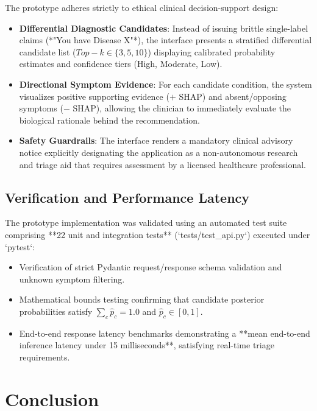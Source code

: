 The prototype adheres strictly to ethical clinical decision-support design:
\begin{itemize}
    \item \textbf{Differential Diagnostic Candidates}: Instead of issuing brittle single-label claims (*"You have Disease X"*), the interface presents a stratified differential candidate list ($Top-k \in \{3, 5, 10\}$) displaying calibrated probability estimates and confidence tiers (High, Moderate, Low).
    \item \textbf{Directional Symptom Evidence}: For each candidate condition, the system visualizes positive supporting evidence ($+$ SHAP) and absent/opposing symptoms ($-$ SHAP), allowing the clinician to immediately evaluate the biological rationale behind the recommendation.
    \item \textbf{Safety Guardrails}: The interface renders a mandatory clinical advisory notice explicitly designating the application as a non-autonomous research and triage aid that requires assessment by a licensed healthcare professional.
\end{itemize}

\subsection{Verification and Performance Latency}
\label{subsec:prototype_verification}

The prototype implementation was validated using an automated test suite comprising **22 unit and integration tests** (`tests/test_api.py`) executed under `pytest`:
\begin{itemize}
    \item Verification of strict Pydantic request/response schema validation and unknown symptom filtering.
    \item Mathematical bounds testing confirming that candidate posterior probabilities satisfy $\sum_{c} \hat{p}_c = 1.0$ and $\hat{p}_c \in [0, 1]$.
    \item End-to-end response latency benchmarks demonstrating a **mean end-to-end inference latency under 15 milliseconds**, satisfying real-time triage requirements.
\end{itemize}

\section{Conclusion}
\label{sec:conclusion}

